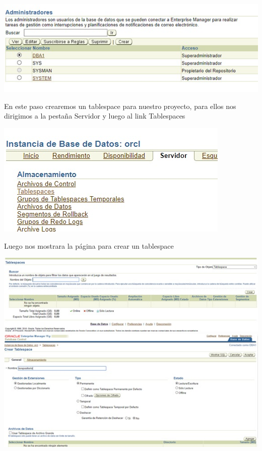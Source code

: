 \begin{flushleft}
\begin{center}
\includegraphics{images/image-27}\\
\end{center}
En este paso crearemos un tablespace para nuestro proyecto, para ellos nos dirigimos a la pestaña Servidor y luego al link Tablespaces\\
\begin{center}
\includegraphics{images/image-28}\\
\end{center}
Luego nos mostrara la página para crear un tablespace\\
\begin{center}
\includegraphics{images/image-29}\\
\includegraphics{images/image-30}\\

\end{center}
\end{flushleft}

